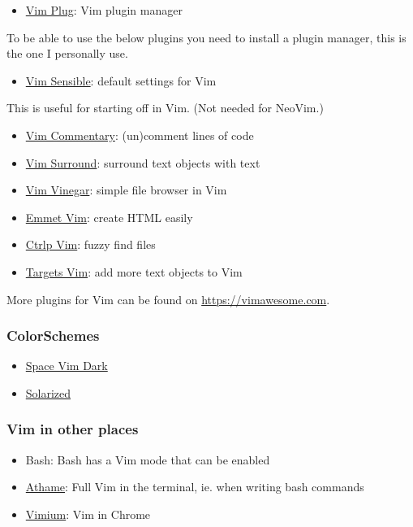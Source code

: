 \documentclass[11pt]{article}
\begin{document}
\begin{itemize}
\item \href{https://github.com/junegunn/vim-plug}{Vim Plug}: Vim plugin manager
\end{itemize}
To be able to use the below plugins you need to install a plugin manager, this
is the one I personally use.

\begin{itemize}
\item \href{https://github.com/tpope/vim-sensible}{Vim Sensible}: default settings for Vim
\end{itemize}
This is useful for starting off in Vim. (Not needed for NeoVim.)

\begin{itemize}
\item \href{https://www.github.com/tpope/vim-commentary}{Vim Commentary}: (un)comment lines of code
\item \href{https://www.github.com/tpope/vim-surround}{Vim Surround}: surround text objects with text
\item \href{https://www.github.com/tpope/vim-vinegar}{Vim Vinegar}: simple file browser in Vim
\item \href{https://www.github.com/mattn/emmet-vim}{Emmet Vim}: create HTML easily
\item \href{https://github.com/ctrlpvim/ctrlp.vim}{Ctrlp Vim}: fuzzy find files
\item \href{https://vimawesome.com/plugin/targets-vim}{Targets Vim}: add more text objects to Vim
\end{itemize}

More plugins for Vim can be found on \url{https://vimawesome.com}.
\subsubsection{ColorSchemes}
\label{sec:org306e93b}
\begin{itemize}
\item \href{https://www.github.com/liuchengxu/space-vim-dark}{Space Vim Dark}
\item \href{https://github.com/altercation/solarized}{Solarized}
\end{itemize}

\subsubsection{Vim in other places}
\label{sec:orgac5df64}
\begin{itemize}
\item Bash: Bash has a Vim mode that can be enabled
\item \href{https://github.com/ardagnir/athame}{Athame}: Full Vim in the terminal, ie. when writing bash commands
\item \href{https://chrome.google.com/webstore/detail/vimium/dbepggeogbaibhgnhhndojpepiihcmeb}{Vimium}: Vim in Chrome
\end{itemize}
\end{document}
